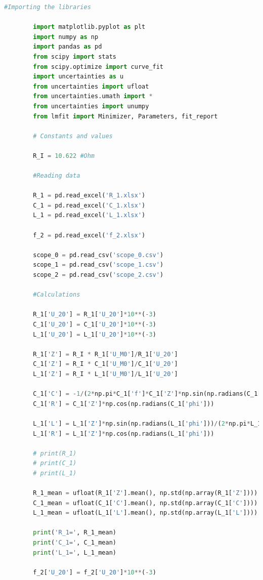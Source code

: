\documentclass[a4paper,11pt]{article}
\begin{document}
    \begin{lstlisting}[language=Python, basicstyle=\tiny, breaklines=true]
        #Importing the libraries

        import matplotlib.pyplot as plt
        import numpy as np
        import pandas as pd
        from scipy import stats
        from scipy.optimize import curve_fit
        import uncertainties as u 
        from uncertainties import ufloat
        from uncertainties.umath import *
        from uncertainties import unumpy
        from lmfit import Minimizer, Parameters, fit_report

        # Constants and values

        R_I = 10.622 #Ohm

        #Reading data

        R_1 = pd.read_excel('R_1.xlsx')
        C_1 = pd.read_excel('C_1.xlsx')
        L_1 = pd.read_excel('L_1.xlsx')
        
        f_2 = pd.read_excel('f_2.xlsx')
        
        scope_0 = pd.read_csv('scope_0.csv')
        scope_1 = pd.read_csv('scope_1.csv')
        scope_2 = pd.read_csv('scope_2.csv')

        #Calculations

        R_1['U_20'] = R_1['U_20']*10**(-3)
        C_1['U_20'] = C_1['U_20']*10**(-3)
        L_1['U_20'] = L_1['U_20']*10**(-3)
        
        R_1['Z'] = R_I * R_1['U_M0']/R_1['U_20']
        C_1['Z'] = R_I * C_1['U_M0']/C_1['U_20']
        L_1['Z'] = R_I * L_1['U_M0']/L_1['U_20']
        
        C_1['C'] = -1/(2*np.pi*C_1['f']*C_1['Z']*np.sin(np.radians(C_1['phi'])))
        C_1['R'] = C_1['Z']*np.cos(np.radians(C_1['phi']))
        
        L_1['L'] = L_1['Z']*np.sin(np.radians(L_1['phi']))/(2*np.pi*L_1['f'])
        L_1['R'] = L_1['Z']*np.cos(np.radians(L_1['phi']))
        
        # print(R_1)
        # print(C_1)
        # print(L_1)
        
        R_1_mean = ufloat(R_1['Z'].mean(), np.std(np.array(R_1['Z'])))
        C_1_mean = ufloat(C_1['C'].mean(), np.std(np.array(C_1['C'])))
        L_1_mean = ufloat(L_1['L'].mean(), np.std(np.array(L_1['L'])))
        
        print('R_1=', R_1_mean)
        print('C_1=', C_1_mean)
        print('L_1=', L_1_mean)
        
        f_2['U_20'] = f_2['U_20']*10**(-3)
        

\end{lstlisting}
\end{document}

